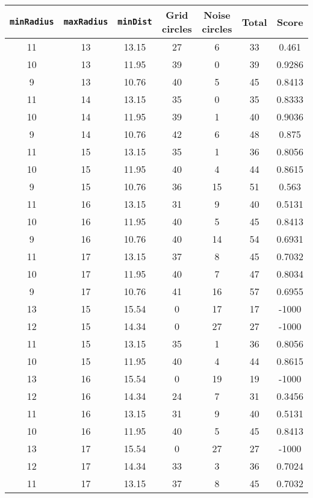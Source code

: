 \documentclass[letterpaper, 12pt]{article}
\begin{document}
\begin{longtable}{|c|c|c|c|c|c|c|}
\hline
\textbf{\texttt{minRadius}} & \textbf{\texttt{maxRadius}} & \textbf{\texttt{minDist}} & \textbf{Grid circles} & \textbf{Noise circles} & \textbf{Total} & \textbf{Score} \\
\hline
11 & 13 & 13.15 & 27 & 6 & 33 & 0.461 \\
\hline
10 & 13 & 11.95 & 39 & 0 & 39 & 0.9286 \\
\hline
9 & 13 & 10.76 & 40 & 5 & 45 & 0.8413 \\
\hline
11 & 14 & 13.15 & 35 & 0 & 35 & 0.8333 \\
\hline
10 & 14 & 11.95 & 39 & 1 & 40 & 0.9036 \\
\hline
9 & 14 & 10.76 & 42 & 6 & 48 & 0.875 \\
\hline
11 & 15 & 13.15 & 35 & 1 & 36 & 0.8056 \\
\hline
10 & 15 & 11.95 & 40 & 4 & 44 & 0.8615 \\
\hline
9 & 15 & 10.76 & 36 & 15 & 51 & 0.563 \\
\hline
11 & 16 & 13.15 & 31 & 9 & 40 & 0.5131 \\
\hline
10 & 16 & 11.95 & 40 & 5 & 45 & 0.8413 \\
\hline
9 & 16 & 10.76 & 40 & 14 & 54 & 0.6931 \\
\hline
11 & 17 & 13.15 & 37 & 8 & 45 & 0.7032 \\
\hline
10 & 17 & 11.95 & 40 & 7 & 47 & 0.8034 \\
\hline
9 & 17 & 10.76 & 41 & 16 & 57 & 0.6955 \\
\hline
13 & 15 & 15.54 & 0 & 17 & 17 & -1000 \\
\hline
12 & 15 & 14.34 & 0 & 27 & 27 & -1000 \\
\hline
11 & 15 & 13.15 & 35 & 1 & 36 & 0.8056 \\
\hline
10 & 15 & 11.95 & 40 & 4 & 44 & 0.8615 \\
\hline
13 & 16 & 15.54 & 0 & 19 & 19 & -1000 \\
\hline
12 & 16 & 14.34 & 24 & 7 & 31 & 0.3456 \\
\hline
11 & 16 & 13.15 & 31 & 9 & 40 & 0.5131 \\
\hline
10 & 16 & 11.95 & 40 & 5 & 45 & 0.8413 \\
\hline
13 & 17 & 15.54 & 0 & 27 & 27 & -1000 \\
\hline
12 & 17 & 14.34 & 33 & 3 & 36 & 0.7024 \\
\hline
11 & 17 & 13.15 & 37 & 8 & 45 & 0.7032 \\
\hline

\end{longtable}
\end{document}
